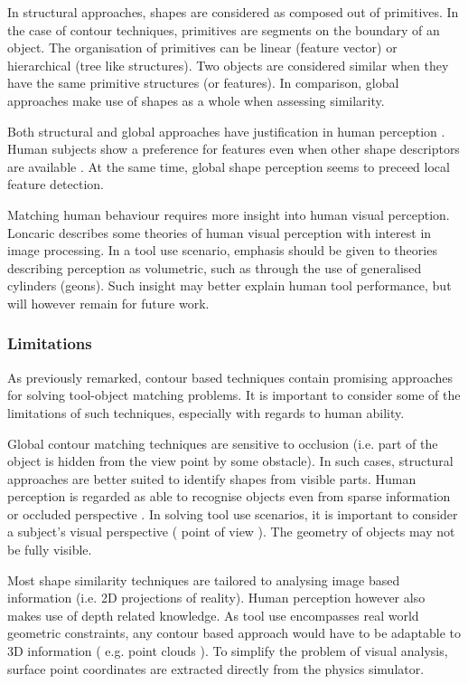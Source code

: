 \documentclass[11]{article}
\begin{document}
In structural approaches, shapes are considered as composed out of primitives. In the case of contour techniques, primitives are segments on the boundary of an object. The organisation of primitives can be linear (feature vector\cite{zhang2004}) or hierarchical (tree like structures\cite{zhu2015}). Two objects are considered similar when they have the same primitive structures (or features). In comparison, global approaches make use of shapes as a whole when assessing similarity. 

Both structural and global approaches have justification in human perception \cite{zhang2004}. Human subjects show a preference for features even when other shape descriptors are available \cite{chatbri2016}. At the same time, global shape perception seems to preceed local feature detection\cite{navon1977}. 

Matching human behaviour requires more insight into human visual perception. Loncaric\cite{loncaric1998} describes some theories of human visual perception with interest in image processing. In a tool use scenario, emphasis should be given to theories describing perception as volumetric, such as through the use of generalised cylinders (geons\cite{dickinson2014}). Such insight may better explain human tool performance, but will however remain for future work.    

\subsubsection{Limitations}
As previously remarked, contour based techniques contain promising approaches for solving tool-object matching problems. It is important to consider some of the limitations of such techniques, especially with regards to human ability. 

Global contour matching techniques are sensitive to occlusion (i.e. part of the object is hidden from the view point by some obstacle). In such cases, structural approaches are better suited to identify shapes from visible parts. Human perception is regarded as able to recognise objects even from sparse information or occluded perspective \cite{loncaric1998}. In solving tool use scenarios, it is important to consider a subject's visual perspective ( point of view ). The geometry of objects may not be fully visible. 

Most shape similarity techniques are tailored to analysing image based information (i.e. 2D projections of reality). Human perception however also makes use of depth related knowledge. As tool use encompasses real world geometric constraints, any contour based approach would have to be adaptable to 3D information ( e.g. point clouds ). To simplify the problem of visual analysis, surface point coordinates are extracted directly from the physics simulator. 
\end{document}
